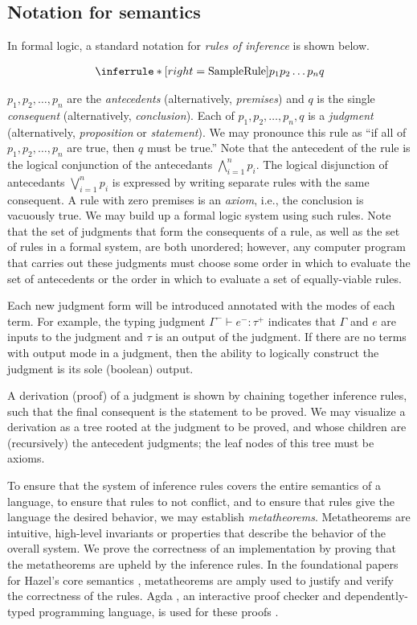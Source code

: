 \subsection{Notation for semantics}
\label{sec:semantics-notation}
In formal logic, a standard notation for \textit{rules of inference} is shown below.
\begin{singlespace}
  \[\Infer{SampleRule}{p_1 \\ p_2 \\ \dots \\ p_n}{q}\]
\end{singlespace}
$p_1,p_2,\dots,p_n$ are the \textit{antecedents} (alternatively, \textit{premises}) and $q$ is the single \textit{consequent} (alternatively, \textit{conclusion}). Each of $p_1,p_2,\dots,p_n,q$ is a \textit{judgment} (alternatively, \textit{proposition} or \textit{statement}). We may pronounce this rule as ``if all of $p_1,p_2,\dots,p_n$ are true, then $q$ must be true.'' Note that the antecedent of the rule is the logical conjunction of the antecedants $\bigwedge_{i=1}^n p_i$. The logical disjunction of antecedants $\bigvee_{i=1}^n p_i$ is expressed by writing separate rules with the same consequent. A rule with zero premises is an \textit{axiom}, i.e., the conclusion is vacuously true. We may build up a formal logic system using such rules. Note that the set of judgments that form the consequents of a rule, as well as the set of rules in a formal system, are both unordered; however, any computer program that carries out these judgments must choose some order in which to evaluate the set of antecedents or the order in which to evaluate a set of equally-viable rules.

Each new judgment form will be introduced annotated with the modes of each term. For example, the typing judgment $\Gamma^-\vdash e^-:\tau^+$ indicates that $\Gamma$ and $e$ are inputs to the judgment and $\tau$ is an output of the judgment. If there are no terms with output mode in a judgment, then the ability to logically construct the judgment is its sole (boolean) output.

A derivation (proof) of a judgment is shown by chaining together inference rules, such that the final consequent is the statement to be proved. We may visualize a derivation as a tree rooted at the judgment to be proved, and whose children are (recursively) the antecedent judgments; the leaf nodes of this tree must be axioms.

To ensure that the system of inference rules covers the entire semantics of a language, to ensure that rules to not conflict, and to ensure that rules give the language the desired behavior, we may establish \textit{metatheorems}. Metatheorems are intuitive, high-level invariants or properties that describe the behavior of the overall system. We prove the correctness of an implementation by proving that the metatheorems are upheld by the inference rules. In the foundational papers for Hazel's core semantics \cite{conf/popl/Hazelnut17,conf/popl/HazelnutLive19}, metatheorems are amply used to justify and verify the correctness of the rules. Agda \cite{bove2009brief}, an interactive proof checker and dependently-typed programming language, is used for these proofs \cite{agda2017,agda-dynamics}.

